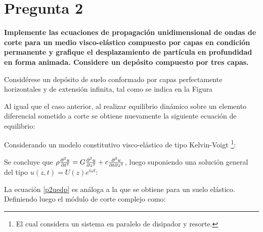 \newpage
\section{Pregunta 2}

\textbf{Implemente las ecuaciones de propagación unidimensional de ondas de corte para un medio visco-elástico compuesto por capas en condición permanente y grafique el desplazamiento de partícula en profundidad en forma animada. Considere un depósito compuesto por tres capas.} \\


Considérese un depósito de suelo conformado por capas perfectamente horizontales y de extensión infinita, tal como se indica en la Figura


Al igual que el caso anterior, al realizar equilibrio dinámico sobre un elemento diferencial sometido a corte se obtiene nuevamente la siguiente ecuación de equilibrio:


Considerando un modelo constitutivo visco-elástico de tipo Kelvin-Voigt \footnote{El cual considera un sistema en paralelo de disipador y resorte.}:


Se concluye que $\rho \pdv[2]{u}{t} = G \pdv[2]{u}{z} + c \frac{\partial^3 u}{\partial t \partial z^2}$, luego suponiendo una solución general del tipo $u(z,t)=U(z)e^{i\omega t}$:



La ecuación \eqref{p2uedp} es análoga a la que se obtiene para un suelo elástico. Definiendo luego el módulo de corte complejo como:

